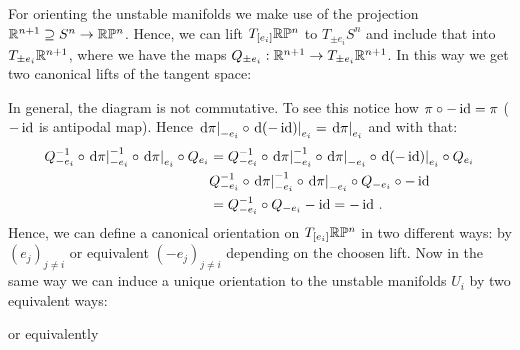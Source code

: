 \begin{example}
			\begin{definition}[Orientations]
				For orienting the unstable manifolds we make use of the projection $\mathbb{R}^{n+1}\supseteq S^n\to \mathbb{R}\mathbb{P}^n$. Hence, we can lift $T_{[e_i]}\mathbb{R}\mathbb{P}^n $ to $T_{\pm e_i}S^n$ and include that into $T_{\pm e_i}\mathbb{R}^{n+1}$, where we have the maps $Q_{\pm e_i}:\mathbb{R}^{n+1}\to T_{\pm e_i}\mathbb{R}^{n+1}$. In this way we get two canonical lifts of the tangent space:
				\begin{center}
				\end{center}
				In general, the diagram is not commutative. To see this notice how $\pi\circ -\operatorname{\mathrm{id}}=\pi$ ($-\operatorname{\mathrm{id}}$ is antipodal map). Hence $\left.\mathop{}\!\mathrm{d} \pi\right|_{-e_i} \circ \left.\mathop{}\!\mathrm{d} (-\operatorname{\mathrm{id}})\right|_{e_i} =\left.\mathop{}\!\mathrm{d} \pi\right|_{e_i}$ and with that:  
				\begin{align*}
					Q_{-e_i}^{-1}\circ \left.\mathop{}\!\mathrm{d} \pi\right|_{-e_i}^{-1}\circ \left.\mathop{}\!\mathrm{d} \pi\right|_{e_i}\circ Q_{e_i}
					&=Q_{-e_i}^{-1}\circ \left.\mathop{}\!\mathrm{d} \pi\right|_{-e_i}^{-1}\circ \left.\mathop{}\!\mathrm{d} \pi\right|_{-e_i} \circ \left.\mathop{}\!\mathrm{d} (-\operatorname{\mathrm{id}})\right|_{e_i} \circ Q_{e_i}\\
					&Q_{-e_i}^{-1}\circ \left.\mathop{}\!\mathrm{d} \pi\right|_{-e_i}^{-1}\circ \left.\mathop{}\!\mathrm{d} \pi\right|_{-e_i} \circ Q_{-e_i}\circ -\operatorname{\mathrm{id}} \\
					&=Q_{-e_i}^{-1}\circ Q_{-e_i} -\operatorname{\mathrm{id}} =-\operatorname{\mathrm{id}}\,.
				\end{align*} Hence, we can define a canonical orientation on $T_{[e_i]}\mathbb{R}\mathbb{P}^n$ in two different ways: by $(e_j)_{j\neq i}$ or equivalent $(-e_j)_{j\neq i}$ depending on the choosen lift. Now in the same way we can induce a unique orientation to the unstable manifolds $U_i$ by two equivalent ways:
							\begin{center}
					or equivalently 
					

\end{center}
\end{definition}
\end{example}
